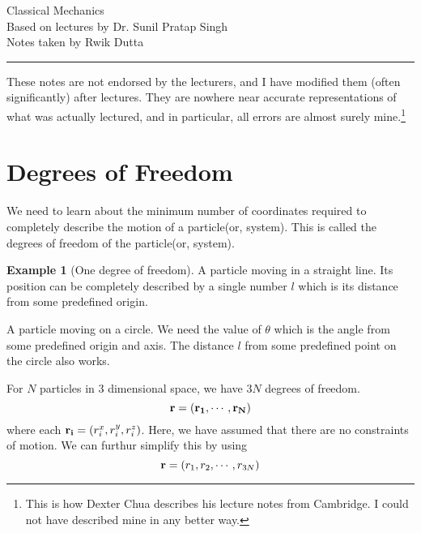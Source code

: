 \documentclass[10pt, a4paper]{extarticle}
\theoremstyle{definition}
\newtheorem{eg}{Example}
\begin{document}
\begin{center}
	\fontsize{25}{60}\selectfont Classical Mechanics \\
	\large Based on lectures by Dr. Sunil Pratap Singh\\
	Notes taken by Rwik Dutta
\end{center}
\hrule
\begin{center}
	These notes are not endorsed by the lecturers, and I have modified them (often
	significantly) after lectures. They are nowhere near accurate representations of what
	was actually lectured, and in particular, all errors are almost surely mine.\footnote[1]{This is how Dexter Chua describes his lecture notes from Cambridge. I could not have described mine in any better way.}
\end{center}
\tableofcontents

\newpage

\section{Degrees of Freedom}
We need to learn about the minimum number of coordinates required to completely describe the motion of a particle(or, system). This is called the degrees of freedom of the particle(or, system).
\begin{eg}[One degree of freedom]
	A particle moving in a straight line. Its position can be completely described by a single number $l$ which is its distance from some predefined origin.

	A particle moving on a circle. We need the value of $\theta$ which is the angle from some predefined origin and axis. The distance $l$ from some predefined point on the circle also works.
\end{eg}

For $N$ particles in 3 dimensional space, we have $3N$ degrees of freedom.
\[\vb{r}=(\vb{r_1},\cdots,\vb{r_N})\] where each $\vb{r_i}=(r^x_i,r^y_i,r^z_i)$. Here, we have assumed that there are no constraints of motion.
We can furthur simplify this by using \[\vb{r}=(r_1,r_2,\cdots,r_{3N})\]
\end{document}
